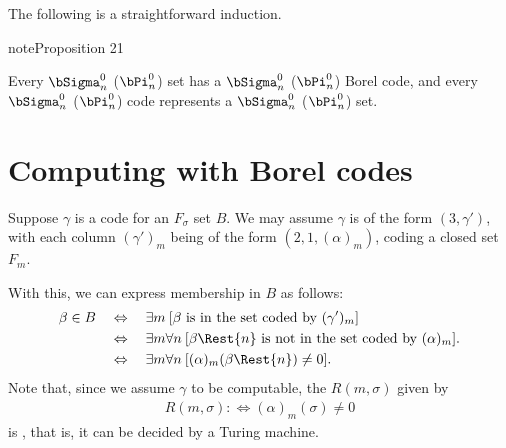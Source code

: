 \documentclass[letterpaper,10pt,english]{jupyterBook}
\begin{document}
\sphinxAtStartPar
The following is a straightforward induction.
\label{codingBorel:prop-Borel-codes}
\begin{sphinxadmonition}{note}{Proposition 21}



\sphinxAtStartPar
Every \(\bSigma^0_n\) (\(\bPi^0_n\)) set has a \(\bSigma^0_n\) (\(\bPi^0_n\)) Borel code, and every \(\bSigma^0_n\) (\(\bPi^0_n\)) code represents a \(\bSigma^0_n\) (\(\bPi^0_n\)) set.
\end{sphinxadmonition}






\section{Computing with Borel codes}
\label{\detokenize{codingBorel:computing-with-borel-codes}}
\sphinxAtStartPar
Suppose \(\gamma\) is a  code for an \(F_\sigma\) set \(B\). We may assume \(\gamma\) is of the form \((3,\gamma')\), with each column \((\gamma')_m\) being of the form \((2,1,(\alpha)_m)\), coding a closed set \(F_m\).

\sphinxAtStartPar
With this, we can express membership in \(B\) as follows:
\begin{align*}
    \beta \in B \quad & \Leftrightarrow \quad \exists m \: [\text{$\beta$ is in the set coded by $(\gamma')_m$}] \\
        & \Leftrightarrow \quad \exists m \forall n \: [\beta\Rest{n} \text{ is not in the set coded by } (\alpha)_m]. \\
        & \Leftrightarrow \quad \exists m \forall n \: [(\alpha)_m(\beta\Rest{n}) \neq 0 ].
\end{align*}
\sphinxAtStartPar
Note that, since we assume \(\gamma\) to be computable, the  \(R(m,\sigma)\) given by
\begin{equation*}
\begin{split}
R(m,\sigma) :\iff (\alpha)_m(\sigma) \neq 0
\end{split}
\end{equation*}
\sphinxAtStartPar
is , that is, it can be decided by a Turing machine.
\end{document}
